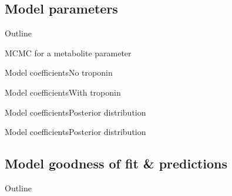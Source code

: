 \documentclass[xcolor=dvipsnames]{beamer}
\begin{document}
\subsection{Model parameters}
\begin{frame}{Outline}
	\vspace{-10.5pt}
	\tableofcontents[currentsection,subsectionstyle=show/shaded/hide]
\end{frame}

\begin{frame}{MCMC for a metabolite parameter}
	\vspace{-5pt}
	\begin{center}
	\end{center}
\end{frame}


\begin{frame}{Model coefficients}{No troponin}
	\vspace{-5pt}
	\begin{center}
	\end{center}
\end{frame}

\begin{frame}{Model coefficients}{With troponin}
	\vspace{-5pt}
	\begin{center}
	\end{center}
\end{frame}

\begin{frame}{Model coefficients}{Posterior distribution}
		\vspace{-5pt}
		\begin{center}
		\end{center}
\end{frame}

\begin{frame}{Model coefficients}{Posterior distribution}
	\vspace{-5pt}
	\begin{center}
	\end{center}
\end{frame}

\subsection{Model goodness of fit \& predictions}
\begin{frame}{Outline}
	\vspace{-10.5pt}
	\tableofcontents[currentsection,subsectionstyle=show/shaded/hide]
\end{frame}
\end{document}
